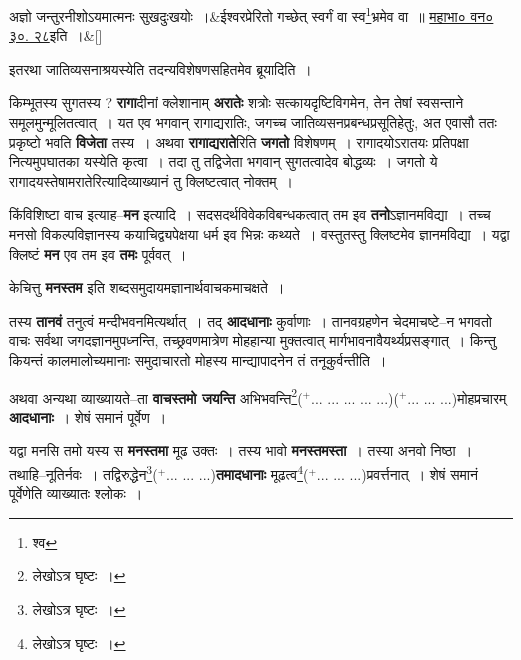 \documentclass[article,12pt,a4paper]{memoir}
\newcommand{\add}[1]{($^{+}$#1)}
\begin{document}
	  \bigskip
	  \begingroup
	
	    
	    \stanza[\smallbreak]
	अज्ञो जन्तुरनीशोऽयमात्मनः सुखदुःखयोः ।&ईश्वरप्रेरितो गच्छेत् स्वर्गं वा स्व\footnote{श्व}\-भ्रमेव वा ॥ \href{http://http://sarit.indology.info/?cref=MBh.3.30.28}{महाभा० वन० ३०. २८}इति ।\&[\smallbreak]


	
	  \endgroup
	

	  \pstart इतरथा जातिव्यसनाश्रयस्येति तदन्यविशेषणसहितमेव ब्रूयादिति ।
	\pend
      

	  \pstart किम्भूतस्य सुगतस्य ? \textbf{रागा}दीनां क्लेशानाम् \textbf{अरातेः} शत्रोः सत्कायदृष्टिविगमेन, तेन तेषां स्वसन्ताने समूलमुन्मूलितत्वात् । यत एव भगवान् रागाद्यरातिः, जगच्च जातिव्यसनप्रबन्धप्रसूतिहेतुः, अत एवासौ ततः प्रकृष्टो भवति \textbf{विजेता} तस्य । अथवा \textbf{रागाद्यराते}रिति \textbf{जगतो} विशेषणम् । रागादयोऽरातयः प्रतिपक्षा नित्यमुपघातका यस्येति कृत्वा । तदा तु तद्विजेता भगवान् सुगतत्वादेव बोद्धव्यः । जगतो ये रागादयस्तेषामरातेरित्यादिव्याख्यानं तु क्लिष्टत्वात् नोक्तम् ।
	\pend
      

	  \pstart किंविशिष्टा वाच इत्याह--\textbf{मन} इत्यादि । सदसदर्थविवेकविबन्धकत्वात् तम इव \textbf{तनो}ऽज्ञानमविद्या । तच्च मनसो विकल्पविज्ञानस्य कयाचिद्व्यपेक्षया धर्म इव भिन्नः कथ्यते । वस्तुतस्तु क्लिष्टमेव ज्ञानमविद्या । यद्वा क्लिष्टं \textbf{मन} एव तम इव \textbf{तमः} पूर्ववत् ।
	\pend
      

	  \pstart केचित्तु \textbf{मनस्तम} इति शब्दसमुदायमज्ञानार्थवाचकमाचक्षते ।
	\pend
      

	  \pstart तस्य \textbf{तानवं} तनुत्वं मन्दीभवनमित्यर्थात् । तद् \textbf{आदधानाः} कुर्वाणाः । तानवग्रहणेन चेदमाचष्टे--न भगवतो वाचः सर्वथा जगदज्ञानमुपध्नन्ति, तच्छ्रवणमात्रेण मोहहान्या मुक्तत्वात् मार्गभावनावैयर्थ्यप्रसङ्गात् । किन्तु कियन्तं कालमालोच्यमानाः समुदाचारतो मोहस्य मान्द्यापादनेन तं तनूकुर्वन्तीति ।
	\pend
      

	  \pstart अथवा अन्यथा व्याख्यायते--ता \textbf{वाचस्तमो जयन्ति} अभिभवन्ति\footnote{लेखोऽत्र घृष्टः ।}\add{... ... ... ... ...}\leavevmode{}\add{... ... ...}मोहप्रचारम् \textbf{आदधानाः} । शेषं समानं पूर्वेण ।
	\pend
      

	  \pstart यद्वा मनसि तमो यस्य स \textbf{मनस्तमा} मूढ उक्तः । तस्य भावो \textbf{मनस्तमस्ता} । तस्या अनवो निष्ठा । तथाहि--नूतिर्नवः । तद्विरुद्धेन\footnote{लेखोऽत्र घृष्टः ।}\add{... ... ...}\textbf{तमादधानाः} मूढत्व\footnote{लेखोऽत्र घृष्टः ।}\add{... ... ...}प्रवर्त्तनात् । शेषं समानं पूर्वेणेति व्याख्यातः श्लोकः ।
	\pend
      
\end{document}
